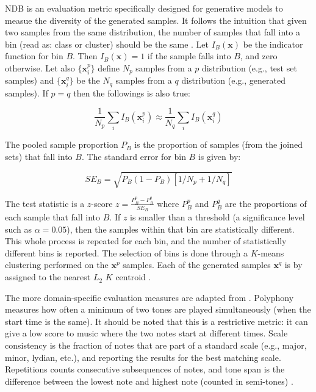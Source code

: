 NDB is an evaluation metric specifically designed for generative models to measue the diversity of the generated samples. It follows the intuition that given two samples from the same distribution, the number of samples that fall into a bin (read as: class or cluster) should be the same \parencite{richardson_gans_2018}. Let $I_B(\mathbf{x})$ be the indicator function for bin $B$. Then $I_B(\mathbf{x}) = 1$ if the sample falls into $B$, and zero otherwise. Let also $\{\mathbf{x}_i^p\}$ define $N_p$ samples from a $p$ distribution (e.g., test set samples) and $\{\mathbf{x}_i^q\}$ be the $N_q$ samples from a $q$ distribution (e.g., generated samples). If $p = q$ then the followings is also true:

\begin{equation}
    \frac{1}{N_p} \sum_i I_B(\mathbf{x}_i^p) \approx \frac{1}{N_q} \sum_i I_B(\mathbf{x}_i^q)
\end{equation}

The pooled sample proportion $P_B$ is the proportion of samples (from the joined sets) that fall into $B$. The standard error for bin $B$ is given by:

\begin{equation}
    SE_B = \sqrt{P_B (1 - P_B)[1 / N_p + 1 / N_q]}
\end{equation}

The test statistic is a $z$-score $z = \frac{P_B^p - P_B^q}{SE_B}$ where $P_B^p$ and $P_B^q$ are the proportions of each sample that fall into $B$. If $z$ is smaller than a threshold (a significance level such as $\alpha = 0.05$), then the samples within that bin are statistically different. This whole process is repeated for each bin, and the number of statistically different bins is reported. The selection of bins is done through a $K$-means clustering performed on the $\mathbf{x}^p$ samples. Each of the generated samples $\mathbf{x}^q$ is by assigned to the nearest $L_2$ $K$ centroid \parencite{richardson_gans_2018}.

The more domain-specific evaluation measures are adapted from \textcite{mogren_c-rnn-gan_2016}. Polyphony measures how often a minimum of two tones are played simultaneously (when the start time is the same). It should be noted that this is a restrictive metric: it can give a low score to music where the two notes start at different times. Scale consistency is the fraction of notes that are part of a standard scale (e.g., major, minor, lydian, etc.), and reporting the results for the best matching scale. Repetitions counts consecutive subsequences of notes, and tone span is the difference between the lowest note and highest note (counted in semi-tones) \parencite{mogren_c-rnn-gan_2016}.

